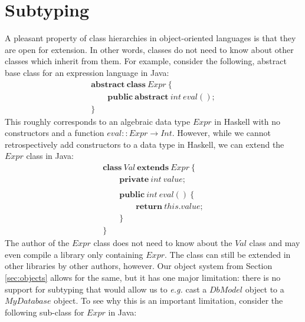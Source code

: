 \section{Subtyping}
\label{sec:encoding}

A pleasant property of class hierarchies in object-oriented languages is that they are open for extension. In other words, classes do not need to know about other classes which inherit from them. For example, consider the following, abstract base class for an expression language in Java:
\begin{displaymath}
\begin{array}{l}
\mathbf{abstract}~\mathbf{class}~\mathit{Expr}~\{\\
\qquad \mathbf{public}~\mathbf{abstract}~\mathit{int}~\mathit{eval}();\\
\}
\end{array}
\end{displaymath}
This roughly corresponds to an algebraic data type $\mathit{Expr}$ in Haskell with no constructors and a function $\mathit{eval} :: \mathit{Expr} \to \mathit{Int}$. However, while we cannot retrospectively add constructors to a data type in Haskell, we can extend the $\mathit{Expr}$ class in Java:
\begin{displaymath}
\begin{array}{l}
\mathbf{class}~\mathit{Val}~\mathbf{extends}~\mathit{Expr}~\{\\
\qquad \mathbf{private}~\mathit{int}~\mathit{value};\\\\
\qquad \mathbf{public}~\mathit{int}~\mathit{eval}()~\{\\
\qquad \qquad \mathbf{return}~\mathit{this}.\mathit{value};\\
\qquad \}\\
\}
\end{array}
\end{displaymath}
The author of the $\mathit{Expr}$ class does not need to know about the $\mathit{Val}$ class and may even compile a library only containing $\mathit{Expr}$. The class can still be extended in other libraries by other authors, however. Our object system from Section \ref{sec:objects} allows for the same, but it has one major limitation: there is no support for subtyping that would allow us to \emph{e.g.} cast a $\mathit{DbModel}$ object to a $\mathit{MyDatabase}$ object. To see why this is an important limitation, consider the following sub-class for $\mathit{Expr}$ in Java:

